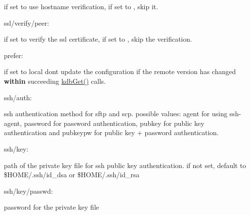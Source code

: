 \begin{DoxyItemize}
if set to {} use hostname verification, if set to {}, skip it.
\item {\ttfamily ssl/verify/peer}\+:

if set to {} verify the ssl certificate, if set to {}, skip the verification.
\item {\ttfamily prefer}\+:

if set to {\ttfamily local} don\textquotesingle{}t update the configuration if the remote version has changed {\bfseries{within}} succeeding {\ttfamily \mbox{\hyperlink{group__kdb_ga28e385fd9cb7ccfe0b2f1ed2f62453a1}{kdb\+Get()}}} calls.
\item {\ttfamily ssh/auth}\+:

ssh authentication method for sftp and scp. possible values\+: {\ttfamily agent} for using {\ttfamily ssh-\/agent}, {\ttfamily password} for password authentication, {\ttfamily pubkey} for public key authentication and {\ttfamily pubkeypw} for public key + password authentication.
\item {\ttfamily ssh/key}\+:

path of the private key file for ssh public key authentication. if not set, default to {\ttfamily \$\+H\+O\+ME/.ssh/id\+\_\+dsa} or {\ttfamily \$\+H\+O\+ME/.ssh/id\+\_\+rsa}
\item {\ttfamily ssh/key/passwd}\+:

password for the private key file
\end{DoxyItemize}


